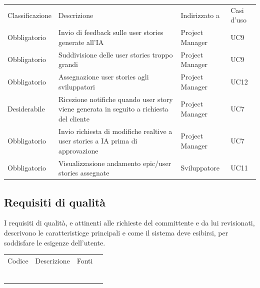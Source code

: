 \documentclass{article}
\begin{document}
\begin{center}
\begin{tabular}{|p{3cm}|p{6cm}|p{}|p{3cm}|}
\end{tabular}

    \begin{tabular}{|p{3cm}|p{6cm}|p{}|p{3cm}|}
    \rowcolor{Blue} 
\hline
Classificazione & Descrizione & Indirizzato a&Casi d'uso  \\ 
\rowcolor{LightBlue}
\hline
Obbligatorio & Invio di feedback sulle user stories generate all'IA& Project Manager&UC9\\
\hline
\rowcolor{LighterBlue}

Obbligatorio & Suddivisione delle user stories troppo grandi  & Project Manager& UC9\\
\hline
\rowcolor{LightBlue}

Obbligatorio & Assegnazione user stories agli sviluppatori& Project Manager& UC12\\
\hline
\rowcolor{LighterBlue}

Desiderabile & Ricezione notifiche quando user story viene generata in seguito a richiesta del cliente & Project Manager & UC7\\
\hline
\rowcolor{LightBlue}

Obbligatorio & Invio richiesta di modifiche realtive a user stories a IA prima di approvazione& Project Manager& UC7\\
\hline
\rowcolor{LighterBlue}

Obbligatorio & Visualizzasione andamento epic/user stories assegnate& Sviluppatore& UC11\\

\hline
\end{tabular}
\end{center}

\subsection{Requisiti di qualità}
I requisiti di qualità, e attinenti alle richieste del committente e da lui revisionati,  descrivono le caratteristicge principali e come il sistema deve esibirsi, per soddisfare le esigenze dell'utente.

\begin{center}
    \begin{tabular}{|p{3cm}|p{6cm}|p{}|p{3cm}|}
    \rowcolor{Blue} 
\hline
Codice & Descrizione & Fonti  \\ 
\rowcolor{LightBlue}
\hline
& &  \\ 
\rowcolor{LighterBlue}
\hline
 & & \\ 
\rowcolor{LightBlue}
\hline
 & & \\
\hline
\rowcolor{LighterBlue}

& & \\
\rowcolor{LightBlue}
\hline
& & \\
\hline
\rowcolor{LighterBlue}

 & & \\
\hline
\end{tabular}
\end{center}
\end{document}
